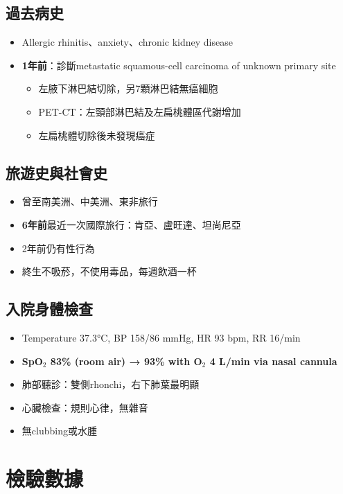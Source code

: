 \documentclass[12pt,a4paper]{article}
\begin{document}
\subsection{過去病史}
\begin{itemize}
    \item Allergic rhinitis、anxiety、chronic kidney disease
    \item \textbf{1年前}：診斷metastatic squamous-cell carcinoma of unknown primary site
    \begin{itemize}
        \item 左腋下淋巴結切除，另7顆淋巴結無癌細胞
        \item PET-CT：左頸部淋巴結及左扁桃體區代謝增加
        \item 左扁桃體切除後未發現癌症
    \end{itemize}
\end{itemize}

\subsection{旅遊史與社會史}
\begin{itemize}
    \item 曾至南美洲、中美洲、東非旅行
    \item \textbf{6年前}最近一次國際旅行：肯亞、盧旺達、坦尚尼亞
    \item 2年前仍有性行為
    \item 終生不吸菸，不使用毒品，每週飲酒一杯
\end{itemize}

\subsection{入院身體檢查}
\begin{itemize}
    \item Temperature 37.3°C, BP 158/86 mmHg, HR 93 bpm, RR 16/min
    \item \textbf{SpO$_2$ 83\% (room air) → 93\% with O$_2$ 4 L/min via nasal cannula}
    \item 肺部聽診：雙側rhonchi，右下肺葉最明顯
    \item 心臟檢查：規則心律，無雜音
    \item 無clubbing或水腫
\end{itemize}

\section{檢驗數據}
\end{document}
